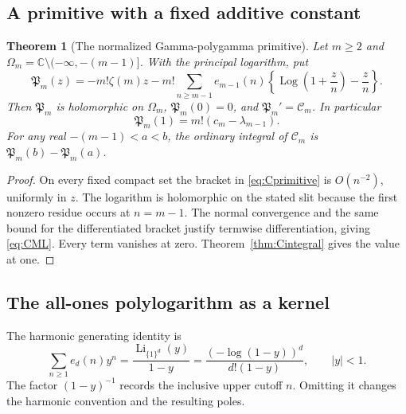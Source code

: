 \documentclass[11pt,a4paper]{article}
\numberwithin{equation}{section}
\newtheorem{theorem}{Theorem}[section]
\theoremstyle{definition}
\DeclareMathOperator{\Li}{Li}
\DeclareMathOperator{\Log}{Log}
\newcommand{\C}{\mathbb C}
\newcommand{\CM}{\mathcal C}
\begin{document}
\subsection{A primitive with a fixed additive constant}

\begin{theorem}[The normalized Gamma-polygamma primitive]
\label{thm:Cprimitive}
Let $m\ge2$ and $\Omega_m=\C\setminus(-\infty,-(m-1)]$.
With the principal logarithm, put
\begin{equation}\label{eq:Cprimitive}
 \mathfrak P_m(z)=-m!\zeta(m)z
  -m!\sum_{n\ge m-1}e_{m-1}(n)
       \left\{\Log\left(1+\frac zn\right)-\frac zn\right\}.
\end{equation}
Then $\mathfrak P_m$ is holomorphic on $\Omega_m$,
$\mathfrak P_m(0)=0$, and $\mathfrak P_m'=\CM_m$. In particular
\begin{equation}\label{eq:primitive_atone}
 \mathfrak P_m(1)=m!(c_m-\lambda_{m-1}).
\end{equation}
For any real $-(m-1)<a<b$, the ordinary integral of $\CM_m$ is
$\mathfrak P_m(b)-\mathfrak P_m(a)$.
\end{theorem}
\begin{proof}
On every fixed compact set the bracket in \eqref{eq:Cprimitive} is
$O(n^{-2})$, uniformly in $z$. The logarithm is holomorphic on the
stated slit because the first nonzero residue occurs at $n=m-1$.
The normal convergence and the same bound for the differentiated
bracket justify termwise differentiation, giving \eqref{eq:CML}.
Every term vanishes at zero. Theorem~\ref{thm:Cintegral} gives the
value at one.
\end{proof}

\subsection{The all-ones polylogarithm as a kernel}

The harmonic generating identity is
\begin{equation}\label{eq:harmonic_polylog_kernel}
 \sum_{n\ge1}e_d(n)y^n
    =\frac{\Li_{\{1\}^d}(y)}{1-y}
    =\frac{(-\log(1-y))^d}{d!(1-y)},\qquad |y|<1.
\end{equation}
The factor $(1-y)^{-1}$ records the inclusive upper cutoff $n$.
Omitting it changes the harmonic convention and the resulting poles.
\end{document}
